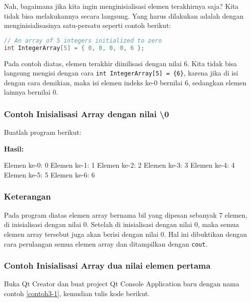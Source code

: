 Nah, bagaimana jika kita ingin menginisialisasi elemen terakhirnya saja?
Kita tidak bisa melakukannya secara langsung. Yang harus dilakukan
adalah dengan menginisialisasinya satu-persatu seperti contoh berikut:

\begin{lstlisting}[language=c++, numbers=none]
// An array of 5 integers initialized to zero
int IntegerArray[5] = { 0, 0, 0, 0, 6 };
\end{lstlisting}

Pada contoh diatas, elemen terakhir diinilisasi dengan nilai 6. Kita
tidak bisa langsung mengisi dengan cara
\texttt{int\ IntegerArray{[}5{]}\ =\ \{6\}}, karena jika di isi dengan
cara demikian, maka isi elemen indeks ke-0 bernilai 6, sedangkan elemen
lainnya bernilai 0.

\subsubsection*{Contoh  Inisialisasi Array dengan nilai \textbackslash{}0}

Buatlah program berikut:



\textbf{Hasil:}

\begin{lcverbatim}
Elemen ke-0: 0
Elemen ke-1: 1
Elemen ke-2: 2
Elemen ke-3: 3
Elemen ke-4: 4
Elemen ke-5: 5
Elemen ke-6: 6
\end{lcverbatim}

\subsubsection*{Keterangan}

Pada program diatas elemen array bernama bil yang dipesan sebanyak 7
elemen, di inisialisasi dengan nilai 0. Setelah di inisialisasi dengan
nilai 0, maka semua elemen array tersebut juga akan berisi dengan nilai
0. Hal ini dibuktikan dengan cara perulangan semua elemen array dan
ditampilkan dengan \texttt{cout}.

\subsubsection*{Contoh  Inisialisasi Array dua nilai elemen pertama}

Buka Qt Creator dan buat project Qt Console Application baru dengan
nama contoh \ref{contoh3-1}, kemudian tulis kode berikut.

